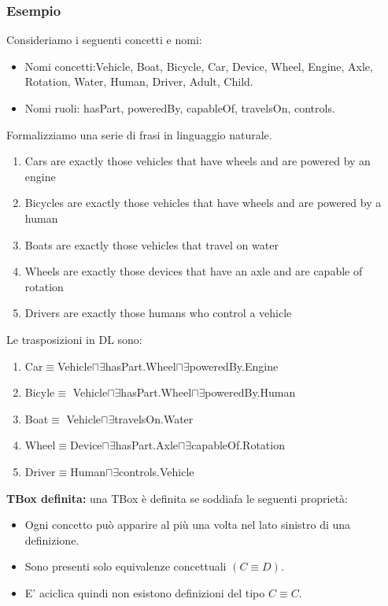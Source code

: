 \documentclass[../main.tex]{subfiles}
\begin{document}
   \subsubsection{Esempio}
   Consideriamo i seguenti concetti e nomi:
   \begin{itemize}
      \item Nomi concetti:Vehicle, Boat, Bicycle, Car, Device, Wheel, Engine, Axle, Rotation, Water, Human, Driver, Adult, Child.
      \item Nomi ruoli: hasPart, poweredBy, capableOf, travelsOn, controls.
   \end{itemize}
   Formalizziamo una serie di frasi in linguaggio naturale.
   \begin{enumerate}
      \item Cars are exactly those vehicles that have wheels and are powered by an engine
      \item Bicycles are exactly those vehicles that have wheels and are powered by a human
      \item Boats are exactly those vehicles that travel on water
      \item Wheels are exactly those devices that have an axle and are capable of rotation
      \item Drivers are exactly those humans who control a vehicle
   \end{enumerate}
   Le trasposizioni in DL sono:
   \begin{enumerate}
      \item Car$\equiv$Vehicle$\sqcap \exists$hasPart.Wheel$\sqcap \exists$poweredBy.Engine
      \item Bicyle$\equiv$ Vehicle$\sqcap \exists$hasPart.Wheel$\sqcap \exists$poweredBy.Human
      \item Boat$\equiv$ Vehicle$\sqcap \exists$travelsOn.Water
      \item Wheel$\equiv$Device$\sqcap \exists$hasPart.Axle$\sqcap \exists$capableOf.Rotation
      \item Driver$\equiv$Human$\sqcap \exists$controls.Vehicle
   \end{enumerate}
   \vspace{2em}
   \textbf{TBox definita:} una TBox è definita se soddiafa le seguenti proprietà:
   \begin{itemize}
      \item Ogni concetto può apparire al più una volta nel lato sinistro di una definizione.
      \item Sono presenti solo equivalenze concettuali $(C \equiv D)$.
      \item E' aciclica quindi non esistono definizioni del tipo $C \equiv C$.
   \end{itemize} 
\end{document}
